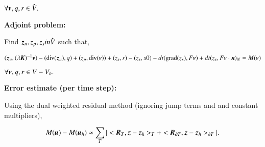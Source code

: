 $\forall \bv, q, r \in \hat{V}.$

{\bf Adjoint problem:}

Find $\bz_u, z_p, z_s in \hat{V}$ such that,

\begin{equation}
(\bz_u, (\lambda\bK)^{-1}\bv) - (\div(\bz_u), q) + (z_p, \div(\bv))
+ (z_s, r) - (z_s, s0) - dt (\grad(z_s), F\bv) + dt (z_s,
F\bv\cdot\bn)_N = M(\bv)
\end{equation}

$\forall \bv, q, r \in V - V_h.$

{\bf Error estimate (per time step):}

Using the dual weighted residual method (ignoring jump terms and and
constant multipliers),

\begin{equation}
M(\bu) - M(\bu_h) \approx  \sum_T |<\bR_T, \bz - \bz_h>_T +
<\bR_{\partial T}, \bz - \bz_h>_{\partial T}| .
\end{equation}








